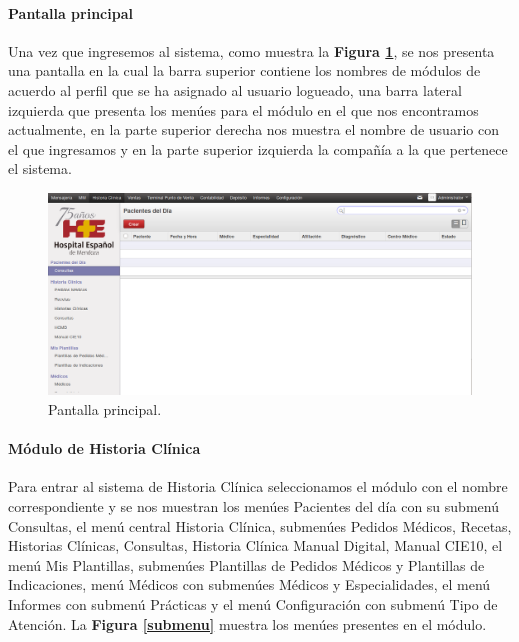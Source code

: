 \paragraph{Pantalla principal}

Una vez que ingresemos al sistema, como muestra la \textbf{Figura \ref{pantalla-princip}}, se nos presenta una pantalla en la cual la barra superior contiene los nombres de módulos de acuerdo al perfil que se ha asignado al usuario logueado, una barra lateral izquierda que presenta los menúes para el módulo en el que nos encontramos actualmente, en la parte superior derecha nos muestra el nombre de usuario con el que ingresamos y en la parte superior izquierda la compañía a la que pertenece el sistema.


\begin{figure}[h]
      \centering
      \includegraphics[width=.8\textwidth]{img/tp1/HE/PantallaPrincip}
      \caption{Pantalla principal.}
      \label{pantalla-princip}
\end{figure}


\paragraph{Módulo de Historia Clínica}

Para entrar al sistema de Historia Clínica seleccionamos el módulo con el nombre correspondiente y se nos muestran los menúes Pacientes del día con su submenú Consultas, el menú central Historia Clínica, submenúes Pedidos Médicos, Recetas, Historias Clínicas, Consultas, Historia Clínica Manual Digital, Manual CIE10, el menú Mis Plantillas, submenúes Plantillas de Pedidos Médicos y Plantillas de Indicaciones, menú Médicos con submenúes Médicos y Especialidades, el menú Informes con submenú Prácticas y el menú Configuración con submenú Tipo de Atención. La \textbf{Figura \ref{submenu}} muestra los menúes presentes en el módulo.

